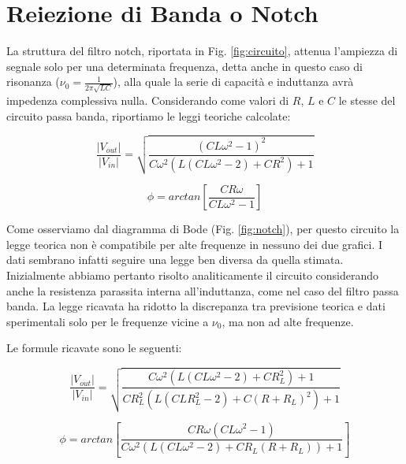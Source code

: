 \section{Reiezione di Banda o Notch}
La struttura del filtro notch, riportata in Fig. \ref{fig:circuito}, attenua l'ampiezza di segnale solo per una determinata frequenza, detta anche in questo caso di risonanza ($\nu_0=\frac{1}{2 \pi \sqrt{LC}}$), alla quale la serie di capacità e induttanza avrà impedenza complessiva nulla. Considerando come valori di $R$, $L$ e $C$ le stesse del circuito passa banda, riportiamo le leggi teoriche calcolate:\\

\noindent
\begin{minipage}{.5\linewidth}
\begin{equation}
\frac{|V_{out}|}{|V_{in}|}=\sqrt{\frac{\left(C L \omega ^2-1\right)^2}{C \omega ^2 \left(L \left(C L \omega ^2-2\right)+C R^2\right)+1}}
\label{notchGain}
\end{equation}
\end{minipage}%
\begin{minipage}{.5\linewidth}
\begin{equation}
\phi=arctan\left[\frac{C R \omega}{C L \omega ^2-1}\right]
\label{notchPhi}
\end{equation}
\end{minipage}
\break

Come osserviamo dal diagramma di Bode (Fig. \ref{fig:notch}), per questo circuito la legge teorica non è compatibile per alte frequenze in nessuno dei due grafici. I dati sembrano infatti seguire una legge ben diversa da quella stimata. Inizialmente abbiamo pertanto risolto analiticamente il circuito considerando anche la resistenza parassita interna all'induttanza, come nel caso del filtro passa banda. La legge ricavata ha ridotto la discrepanza tra previsione teorica e dati sperimentali solo per le frequenze vicine a $\nu_0$, ma non ad alte frequenze.

Le formule ricavate sono le seguenti:\\

\noindent
\begin{minipage}{.5\linewidth}
{\small
\begin{equation}
\frac{|V_{out}|}{|V_{in}|}=\sqrt{\frac{C \omega ^2 \left(L \left(C L \omega ^2-2\right)+C R_L^2\right)+1}{C R_L^2 \left(L \left(C L R_L^2-2\right)+C (R+R_L)^2\right)+1}}
\label{eq:notchGain_corr}
\end{equation}
}
\end{minipage}%
\begin{minipage}{.5\linewidth}
{\small
\begin{equation}
\phi=arctan\left[\frac{C R \omega \left(C L \omega ^2-1\right)}{C \omega ^2 \left(L \left(C L \omega ^2-2\right)+C R_L (R+R_L)\right)+1}\right]
\label{eq:notchPhi_corr}
\end{equation}
}
\end{minipage}\\

